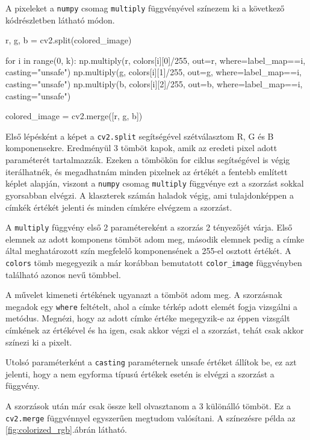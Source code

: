 A pixeleket a \texttt{numpy} csomag \texttt{multiply} függvényével színezem ki a következő kódrészletben látható módon.

\begin{python}
r, g, b = cv2.split(colored_image)

for i in range(0, k):
    np.multiply(r, colors[i][0]/255, out=r,
                where=label_map==i, casting="unsafe")
    np.multiply(g, colors[i][1]/255, out=g,
                where=label_map==i, casting="unsafe")
    np.multiply(b, colors[i][2]/255, out=b,
                where=label_map==i, casting="unsafe")

colored_image = cv2.merge([r, g, b])
\end{python}

Első lépésként a képet a \texttt{cv2.split} segítségével szétválasztom R, G és B komponensekre. Eredményül 3 tömböt kapok, amik az eredeti pixel adott paraméterét tartalmazzák. Ezeken a tömbökön for ciklus segítségével is végig iterálhatnék, és megadhatnám minden pixelnek az értékét a fentebb említett képlet alapján, viszont a \texttt{numpy} csomag \texttt{multiply} függvénye ezt a szorzást sokkal gyorsabban elvégzi. A klaszterek számán haladok végig, ami tulajdonképpen a címkék értékét jelenti és minden címkére elvégzem a szorzást.

A \texttt{multiply} függvény első 2 paramétereként a szorzás 2 tényezőjét várja. Első elemnek az adott komponens tömböt adom meg, második elemnek pedig a címke által meghatározott szín megfelelő komponensének a 255-el osztott értékét. A \texttt{colors} tömb megegyezik a már korábban bemutatott \texttt{color\_image} függvényben található azonos nevű tömbbel. 

A művelet kimeneti értékének ugyanazt a tömböt adom meg. A szorzásnak megadok egy \texttt{where} feltételt, ahol a címke térkép adott elemét fogja vizsgálni a metódus. Megnézi, hogy az adott címke értéke megegyzik-e az éppen vizsgált címkének az értékével és ha igen, csak akkor végzi el a szorzást, tehát csak akkor színezi ki a pixelt.

Utolsó paraméterként a \texttt{casting} paraméternek unsafe értéket állítok be, ez azt jelenti, hogy a nem egyforma típusú értékek esetén is elvégzi a szorzást a függvény. 

A szorzások után már csak össze kell olvasztanom a 3 különálló tömböt. Ez a \texttt{cv2.merge} függvénnyel egyszerűen megtudom valósítani. A színezésre példa az \ref{fig:colorized_rgb}.ábrán látható. 

